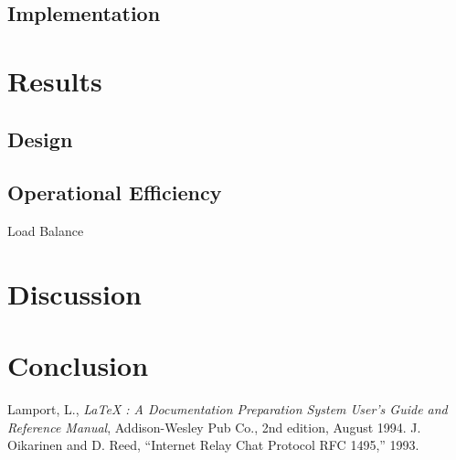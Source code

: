 \documentclass{article}
\begin{document}
\subsection{Implementation}


\section{Results}
\subsection{Design}
\subsection{Operational Efficiency}
Load Balance
\subsection{}

\section{Discussion}

\section{Conclusion}

\begin{thebibliography}{99}
 Lamport, L., {\it LaTeX : A Documentation
 Preparation System User's Guide and Reference Manual}, Addison-Wesley 
 Pub Co., 2nd edition, August 1994.
 J. Oikarinen and D. Reed, “Internet Relay Chat Protocol
RFC 1495,” 1993.
\end{thebibliography}
 
\end{document}

